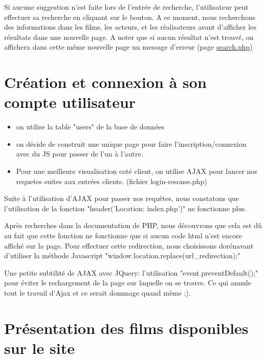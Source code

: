 \documentclass[a4paper, 11pt]{MyReport}
\begin{document}
				Si aucune suggestion n'est faite lors de l'entrée de recherche, l'utilisateur peut effectuer sa recherche en cliquant sur le bouton. A ce moment, nous recherchons des informations dans les films, les acteurs, et les réalisateurs avant d'afficher les résultats dans une nouvelle page. A noter que si aucun résultat n'est trouvé, on affichera dans cette même nouvelle page un message d'erreur (page \url{search.php})



		\section{Création et connexion à son compte utilisateur}

			\begin{itemize}
				\item on utilise la table "users" de la base de données
				\item on décide de construit une unique page pour faire l'inscription/connexion
				avec du JS pour passer de l'un à l'autre.
				\item Pour une meilleure visualisation coté client, on utilise AJAX pour lancer nos requetes suites aux entrées clients. (fichier login-resonse.php)
			\end{itemize}

			\begin{rmq}
				Suite à l'utilisation d'AJAX pour passer nos requêtes, nous constatons que l'utilisation de la fonction "header('Location: index.php')" ne fonctionne plus. 

				Après recherches dans la documentation de PHP, nous découvrons que cela est dû au fait que cette fonction ne fonctionne que si aucun code html n'est encore affiché sur la page. Pour effectuer cette redirection, nous choisissons dorénavant d'utiliser la méthode Javascript "window.location.replace(url\_redirection);"  
			\end{rmq}

			\begin{rmq}
				Une petite subtilité de AJAX avec JQuery: l'utilisation "event.preventDefault();" pour éviter le rechargement de la page sur laquelle on se trouve.  Ce qui annule tout le travail d'Ajax et ce serait dommage quand même ;).
			\end{rmq}

		\section{Présentation des films disponibles sur le site}
\end{document}
